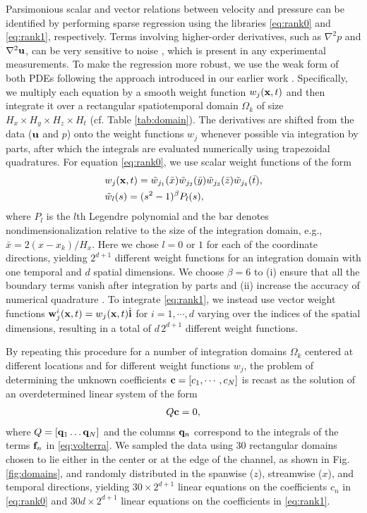 \documentclass[
 reprint,
 amsmath,amssymb,
 aps,
]{revtex4-2}
\begin{document}
Parsimonious scalar and vector relations between velocity and pressure can be identified by performing sparse regression using the libraries \eqref{eq:rank0} and \eqref{eq:rank1}, respectively. Terms involving higher-order derivatives, such as $\nabla^2p$ and $\nabla^2{\bf u}$, can be very sensitive to noise \cite{rudy2017,reinbold2019}, which is present in any experimental measurements. To make the regression more robust, we use the weak form of both PDEs following the approach introduced in our earlier work \cite{gurevich2019}. Specifically, we multiply each equation by a smooth weight function $w_j({\bf x},t)$ and then integrate it over a rectangular spatiotemporal domain $\Omega_k$ of size $H_x\times H_y\times H_z\times H_t$  (cf. Table \ref{tab:domain}). The derivatives are shifted from the data (${\bf u}$ and $p$) onto the weight functions $w_j$ whenever possible via integration by parts, after which the integrals are evaluated numerically using trapezoidal quadratures. For equation \eqref{eq:rank0}, we use scalar weight functions of the form
\begin{align} \label{eq:wf}
&w_j({\bf x},t) = \tilde{w}_{j_1}(\bar{x})\tilde{w}_{j_2}(\bar{y})\tilde{w}_{j_3}(\bar{z})\tilde{w}_{j_4}(\bar{t}), \nonumber\\
&\tilde{w}_l(s) = (s^2-1)^\beta P_l(s),
\end{align}
where $P_l$ is the $l$th Legendre polynomial and the bar denotes nondimensionalization relative to the size of the integration domain, e.g., $\bar{x}=2(x-x_k)/H_x$. Here we chose $l=0$ or $1$ for each of the coordinate directions, yielding $2^{d+1}$ different weight functions for 
an integration domain with one temporal and $d$ spatial dimensions.
We choose $\beta = 6$ to (i) ensure that all the boundary terms vanish after integration by parts and (ii) increase the accuracy of numerical quadrature \cite{gurevich2019}. To integrate \eqref{eq:rank1}, we instead use vector weight functions ${\bf w}^i_j({\bf x},t) = w_j({\bf x},t)\hat{\bf i}$ for $i=1,\cdots,d$ varying over the indices of the spatial dimensions, resulting in a total of $d\,2^{d+1}$ different weight functions. 

By repeating this procedure for a number of integration domains $\Omega_k$ centered at different locations and for different weight functions $w_j$, the problem of determining the unknown coefficients ${\bf c}=[c_1,\cdots,c_N]$ is recast as the solution of an overdetermined linear system of the form
\begin{align}
    Q{\bf c} = 0,
    \label{eq:lin}
\end{align}
where $Q = [{\bf q}_1 \dots {\bf q}_N]$ and the columns ${\bf q}_n$ correspond to the integrals of the terms ${\bf f}_n$ in \eqref{eq:volterra}. We sampled the data using 30 rectangular domains chosen to lie either in the center or at the edge of the channel, as shown in Fig. \ref{fig:domains}, and randomly distributed in the spanwise ($z$), streamwise ($x$), and temporal directions, yielding $30\times 2^{d+1}$ linear equations on the coefficients $c_n$ in \eqref{eq:rank0} and $30d\times 2^{d+1}$ linear equations on the coefficients in \eqref{eq:rank1}.
\end{document}
